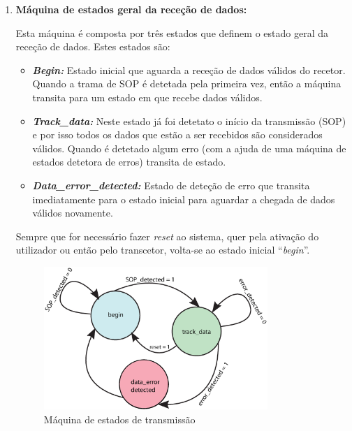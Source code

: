 \documentclass[11pt,a4paper]{article}
\begin{document}
	\begin{enumerate}
		\item \textbf{Máquina de estados geral da receção de dados:}
		
		Esta máquina é composta por três estados que definem o estado geral da receção de dados. Estes estados são:
		\begin{itemize}
			\item \textbf{\textit{Begin:}} Estado inicial que aguarda a receção de dados válidos do recetor. Quando a trama de SOP é detetada pela primeira vez, então a máquina transita para um estado em que recebe dados válidos. 
			
			\item \textbf{\textit{Track\_data:}} Neste estado já foi detetato o início da transmissão (SOP) e por isso todos os dados que estão a ser recebidos são considerados válidos. Quando é detetado algum erro (com a ajuda de uma máquina de estados detetora de erros) transita de estado.
			
			\item \textbf{\textit{Data\_error\_detected:} }Estado de deteção de erro que transita imediatamente para o estado inicial para aguardar a chegada de dados válidos novamente.
			
		\end{itemize}
		
		Sempre que for necessário fazer \textit{reset} ao sistema, quer pela ativação do utilizador ou então pelo transcetor, volta-se ao estado inicial ``\textit{begin}''.
		
		
		\begin{figure}[h!]
			\begin{center}
				\leavevmode
				\includegraphics[width=0.8\textwidth]{fsm1}
				\caption[Máquina de estados de transmissão]{Máquina de estados de transmissão}
				\label{fig:FSM1}
			\end{center}
		\end{figure}
		

\end{enumerate}
\end{document}

